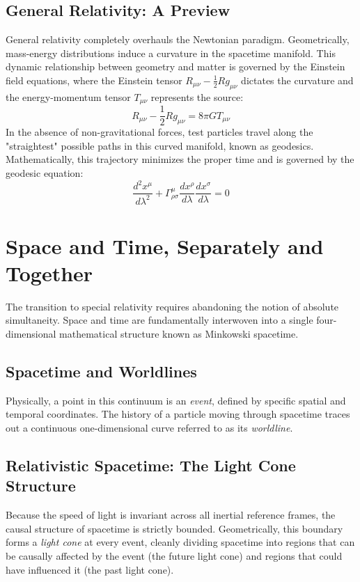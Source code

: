\documentclass[11pt, a4paper]{report}
\begin{document}
\subsection*{General Relativity: A Preview}
General relativity completely overhauls the Newtonian paradigm. Geometrically, mass-energy distributions induce a curvature in the spacetime manifold. This dynamic relationship between geometry and matter is governed by the Einstein field equations, where the Einstein tensor $R_{\mu\nu} - \frac{1}{2} R g_{\mu\nu}$ dictates the curvature and the energy-momentum tensor $T_{\mu\nu}$ represents the source:
\begin{equation}\label{eq:einstein}
R_{\mu\nu} - \frac{1}{2} R g_{\mu\nu} = 8\pi G T_{\mu\nu}
\end{equation}
In the absence of non-gravitational forces, test particles travel along the "straightest" possible paths in this curved manifold, known as geodesics. Mathematically, this trajectory minimizes the proper time and is governed by the geodesic equation:
\begin{equation}\label{eq:geodesic}
\frac{d^2 x^{\mu}}{d\lambda^2} + \Gamma^{\mu}_{\rho\sigma} \frac{dx^{\rho}}{d\lambda} \frac{dx^{\sigma}}{d\lambda} = 0
\end{equation}

\section{Space and Time, Separately and Together}
The transition to special relativity requires abandoning the notion of absolute simultaneity. Space and time are fundamentally interwoven into a single four-dimensional mathematical structure known as Minkowski spacetime. 

\subsection*{Spacetime and Worldlines}
Physically, a point in this continuum is an \emph{event}, defined by specific spatial and temporal coordinates. The history of a particle moving through spacetime traces out a continuous one-dimensional curve referred to as its \emph{worldline}.

\subsection*{Relativistic Spacetime: The Light Cone Structure}
Because the speed of light is invariant across all inertial reference frames, the causal structure of spacetime is strictly bounded. Geometrically, this boundary forms a \emph{light cone} at every event, cleanly dividing spacetime into regions that can be causally affected by the event (the future light cone) and regions that could have influenced it (the past light cone). 
\end{document}
